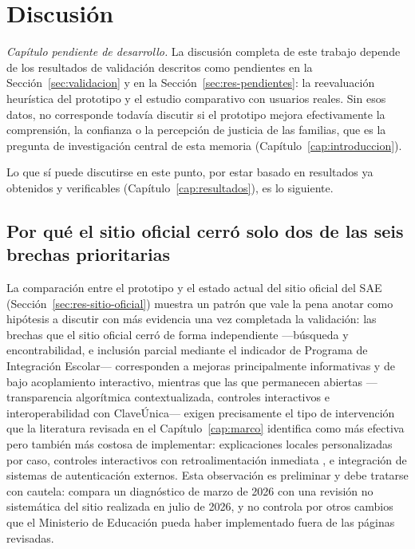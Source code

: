 \chapter{Discusión}\label{cap:discusion}

\emph{Capítulo pendiente de desarrollo.} La discusión completa de este trabajo depende de los resultados de validación descritos como pendientes en la Sección~\ref{sec:validacion} y en la Sección~\ref{sec:res-pendientes}: la reevaluación heurística del prototipo y el estudio comparativo con usuarios reales. Sin esos datos, no corresponde todavía discutir si el prototipo mejora efectivamente la comprensión, la confianza o la percepción de justicia de las familias, que es la pregunta de investigación central de esta memoria (Capítulo~\ref{cap:introduccion}).

Lo que sí puede discutirse en este punto, por estar basado en resultados ya obtenidos y verificables (Capítulo~\ref{cap:resultados}), es lo siguiente.

\section{Por qué el sitio oficial cerró solo dos de las seis brechas prioritarias}

La comparación entre el prototipo y el estado actual del sitio oficial del SAE (Sección~\ref{sec:res-sitio-oficial}) muestra un patrón que vale la pena anotar como hipótesis a discutir con más evidencia una vez completada la validación: las brechas que el sitio oficial cerró de forma independiente —búsqueda y encontrabilidad, e inclusión parcial mediante el indicador de Programa de Integración Escolar— corresponden a mejoras principalmente informativas y de bajo acoplamiento interactivo, mientras que las que permanecen abiertas —transparencia algorítmica contextualizada, controles interactivos e interoperabilidad con ClaveÚnica— exigen precisamente el tipo de intervención que la literatura revisada en el Capítulo~\ref{cap:marco} identifica como más efectiva pero también más costosa de implementar: explicaciones locales personalizadas por caso, controles interactivos con retroalimentación inmediata \citep{kim2021recommender,feddersen2024forecasting}, e integración de sistemas de autenticación externos. Esta observación es preliminar y debe tratarse con cautela: compara un diagnóstico de marzo de 2026 con una revisión no sistemática del sitio realizada en julio de 2026, y no controla por otros cambios que el Ministerio de Educación pueda haber implementado fuera de las páginas revisadas.


